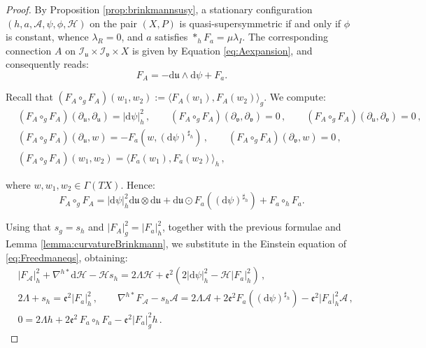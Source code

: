 \documentclass[10pt,a4paper,twoside,reqno]{amsart}
\theoremstyle{plain}
\theoremstyle{definition}
\theoremstyle{remark}
\def\dd{\mathrm{d}}
\def\cH{\mathcal{H}}
\def\cA{\mathcal{A}}
\def\cI{\mathcal{I}}
\def\cH{\mathcal{H}}
\def\dd{\mathrm{d}}
\newcommand{\escal}[1]{\langle#1\rangle}
\def\fru{\mathfrak{u}}
\def\frv{\mathfrak{v}}
\begin{document}
\begin{proof}
By Proposition \ref{prop:brinkmannsusy}, a stationary configuration $(h, a, \cA, \psi, \phi, \cH)$ on the pair $(X,P)$ is quasi-supersymmetric if and only if $\phi$ is constant, whence $\lambda_R = 0$, and $a$ satisfies $\ast_h F_a = \mu \lambda_I$. The corresponding connection $A$ on $\cI_{\fru}\times \cI_{\frv} \times X$ is given by Equation \eqref{eq:Aexpansion}, and consequently reads:
\begin{equation*}
F_A =  - \dd \fru \wedge \dd\psi + F_a.
\end{equation*}

\noindent
Recall that $(F_A\circ_g F_A)(w_1,w_2):=\escal{F_A(w_1),F_A(w_2)}_g$. We compute:
\begin{eqnarray*}
& (F_A\circ_g F_A)(\partial_{\fru} , \partial_{\fru}) = \vert \dd \psi\vert^2_h\, , \qquad (F_A\circ_g F_A)(\partial_{\frv} , \partial_{\frv}) = 0\, ,\qquad (F_A\circ_g F_A)(\partial_{\fru} , \partial_{\frv}) = 0\, ,\\
& (F_A\circ_g F_A)(\partial_{\fru} , w) = - F_a(w,(\dd\psi)^{\sharp_h}) \, , \qquad (F_A\circ_g F_A)(\partial_{\frv} , w) = 0\, ,\\
& (F_A\circ_g F_A)(w_1 , w_2) = \escal{F_a(w_1) , F_a(w_2)}_h\, ,
\end{eqnarray*}

\noindent
where $w, w_1 , w_2 \in\Gamma(TX)$. Hence:
\begin{equation*}
F_A \circ_g F_A = \vert \dd \psi\vert^2_h \dd \fru \otimes \dd \fru + \dd\fru \odot F_a((\dd\psi)^{\sharp_h}) + F_a\circ_h F_a.
\end{equation*}

\noindent
Using that $s_g = s_h$ and $\vert F_A\vert_g^2 = \vert F_a \vert_h^2$, together with the previous formulae and Lemma \ref{lemma:curvatureBrinkmann}, we substitute in the Einstein equation of \eqref{eq:Freedmaneqs}, obtaining:
\begin{eqnarray*}
& \vert F_{\cA}\vert^2_{h} + \nabla^{h\ast}\dd \cH    - \cH s_h =  2\Lambda \cH + \mathfrak{e}^2 (2\vert \dd \psi\vert^2_h -  \cH \vert F_a\vert^2_h)\, ,\\
&  2\Lambda + s_h = \mathfrak{e}^2 \vert F_a \vert^2_h\, , \qquad  \nabla^{h\ast} F_{\cA} - s_h \cA = 2\Lambda \cA + 2\mathfrak{e}^2F_a((\dd\psi)^{\sharp_h}) -  \mathfrak{e}^2 \vert F_a\vert^2_h \cA\, ,\\
& 0 = 2 \Lambda h + 2 \mathfrak{e}^2\, F_a \circ_h F_a -  \mathfrak{e}^2 \vert F_a \vert^2_g h\, .
\end{eqnarray*}


\end{proof}
\end{document}
